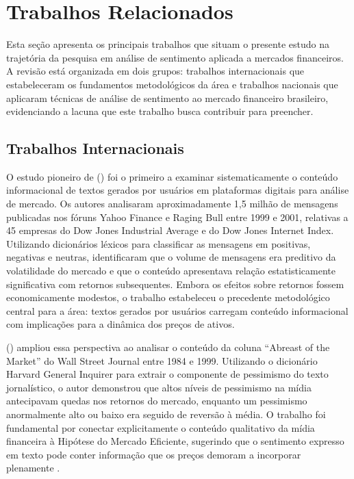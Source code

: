 
\section{Trabalhos Relacionados}
\label{sec:trabalhos_relacionados}

Esta seção apresenta os principais trabalhos que situam o presente estudo na trajetória da pesquisa em análise de sentimento aplicada a mercados financeiros. A revisão está organizada em dois grupos: trabalhos internacionais que estabeleceram os fundamentos metodológicos da área e trabalhos nacionais que aplicaram técnicas de análise de sentimento ao mercado financeiro brasileiro, evidenciando a lacuna que este trabalho busca contribuir para preencher.


\subsection{Trabalhos Internacionais}
\label{subsec:trab_internacionais}

O estudo pioneiro de \citeauthor{antweiler2004} (\citeyear{antweiler2004}) foi o primeiro a examinar sistematicamente o conteúdo informacional de textos gerados por usuários em plataformas digitais para análise de mercado. Os autores analisaram aproximadamente 1,5 milhão de mensagens publicadas nos fóruns Yahoo Finance e Raging Bull entre 1999 e 2001, relativas a 45 empresas do Dow Jones Industrial Average e do Dow Jones Internet Index. Utilizando dicionários léxicos para classificar as mensagens em positivas, negativas e neutras, identificaram que o volume de mensagens era preditivo da volatilidade do mercado e que o conteúdo apresentava relação estatisticamente significativa com retornos subsequentes. Embora os efeitos sobre retornos fossem economicamente modestos, o trabalho estabeleceu o precedente metodológico central para a área: textos gerados por usuários carregam conteúdo informacional com implicações para a dinâmica dos preços de ativos.

\citeauthor{tetlock2007} (\citeyear{tetlock2007}) ampliou essa perspectiva ao analisar o conteúdo da coluna ``Abreast of the Market'' do Wall Street Journal entre 1984 e 1999. Utilizando o dicionário Harvard General Inquirer para extrair o componente de pessimismo do texto jornalístico, o autor demonstrou que altos níveis de pessimismo na mídia antecipavam quedas nos retornos do mercado, enquanto um pessimismo anormalmente alto ou baixo era seguido de reversão à média. O trabalho foi fundamental por conectar explicitamente o conteúdo qualitativo da mídia financeira à Hipótese do Mercado Eficiente, sugerindo que o sentimento expresso em texto pode conter informação que os preços demoram a incorporar plenamente \cite{tetlock2007,fama1970}.

